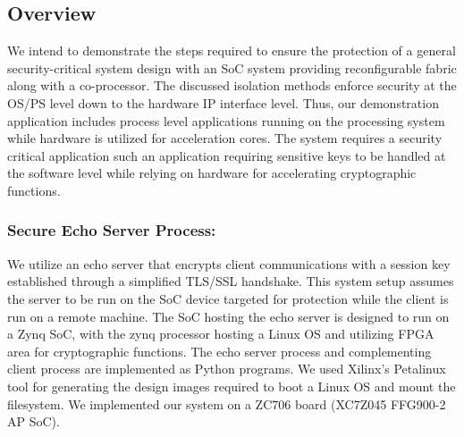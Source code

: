 \documentclass[sigconf]{acmart}
\theoremstyle{plain}
\theoremstyle{remark}
\begin{document}

%


\subsection{Overview}

We intend to demonstrate the steps required to ensure the protection of a general security-critical system design with an SoC system providing reconfigurable fabric along with a co-processor. The discussed isolation methods enforce security at the OS/PS level down to the hardware IP interface level. Thus, our demonstration application includes process level applications running on the processing system while hardware is utilized for acceleration cores. The system requires a security critical application such an application requiring sensitive keys to be handled at the software level while relying on hardware for accelerating cryptographic functions.

\subsubsection{Secure Echo Server Process:}
We utilize an echo server that encrypts client communications with a session key established through a simplified TLS/SSL handshake. This system setup assumes the server to be run on the SoC device targeted for protection while the client is run on a remote machine. The SoC hosting the echo server is designed to run on a Zynq SoC, with the zynq processor hosting a Linux OS and utilizing FPGA area for cryptographic functions. The echo server process and complementing client process are implemented as Python programs. We used Xilinx's Petalinux tool for generating the design images required to boot a Linux OS and mount the filesystem. We implemented our system on a ZC706 board (XC7Z045 FFG900-2 AP SoC).
\end{document}
